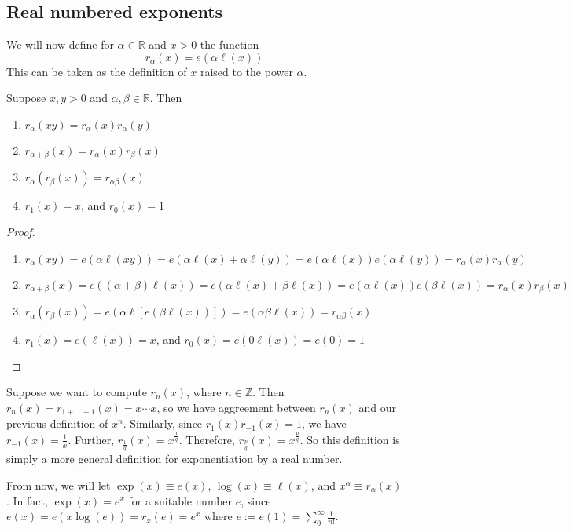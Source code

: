 \subsection{Real numbered exponents}
We will now define for \(\alpha \in \mathbb R\) and \(x > 0\) the function
\[
	r_\alpha(x) = e(\alpha \ell(x))
\]
This can be taken as the definition of \(x\) raised to the power \(\alpha\).
\begin{theorem}
	Suppose \(x, y > 0\) and \(\alpha, \beta \in \mathbb R\).
	Then
	\begin{enumerate}
		\item \(r_\alpha(xy) = r_\alpha(x)r_\alpha(y)\)
		\item \(r_{\alpha + \beta}(x) = r_\alpha(x) r_\beta(x)\)
		\item \(r_\alpha(r_\beta(x)) = r_{\alpha\beta}(x)\)
		\item \(r_1(x) = x\), and \(r_0(x) = 1\)
	\end{enumerate}
\end{theorem}
\begin{proof}
	\begin{enumerate}
		\item \(r_\alpha(xy) = e(\alpha \ell(xy)) = e(\alpha \ell(x) + \alpha \ell(y)) = e(\alpha \ell(x))e(\alpha\ell(y)) = r_\alpha(x)r_\alpha(y)\)
		\item \(r_{\alpha + \beta}(x) = e((\alpha + \beta) \ell(x)) = e(\alpha\ell(x) + \beta\ell(x)) = e(\alpha\ell(x))e(\beta\ell(x)) = r_\alpha(x) r_\beta(x)\)
		\item \(r_\alpha(r_\beta(x)) = e(\alpha \ell[e(\beta \ell(x))]) = e(\alpha \beta \ell(x)) = r_{\alpha\beta}(x)\)
		\item \(r_1(x) = e(\ell(x)) = x\), and \(r_0(x) = e(0 \ell(x)) = e(0) = 1\)
	\end{enumerate}
\end{proof}
Suppose we want to compute \(r_n(x)\), where \(n \in\mathbb Z\).
Then \(r_n(x) = r_{1 + \dots + 1}(x) = x \cdots x\), so we have aggreement between \(r_n(x)\) and our previous definition of \(x^n\).
Similarly, since \(r_1(x) r_{-1}(x) = 1\), we have \(r_{-1}(x) = \frac{1}{x}\).
Further, \(r_{\frac{1}{q}}(x) = x^\frac{1}{q}\).
Therefore, \(r_{\frac{p}{q}}(x) = x^{\frac{p}{q}}\).
So this definition is simply a more general definition for exponentiation by a real number.

From now, we will let \(\exp(x) \equiv e(x)\), \(\log(x) \equiv \ell(x)\), and \(x^\alpha \equiv r_\alpha(x)\).
In fact, \(\exp(x) = e^x\) for a suitable number \(e\), since \(e(x) = e(x \log(e)) = r_x(e) = e^x\) where \(e := e(1) = \sum_0^\infty \frac{1}{n!}\).

